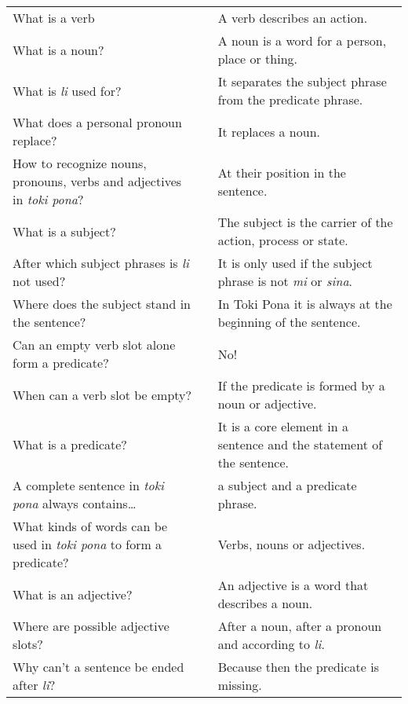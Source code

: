 \begin{supertabular}{p{5,5cm}|ll}
What is a verb && A verb describes an action. \\ %
What is a noun? &&  A noun is a word for a person, place or thing. \\ %
What is \textit{li} used for?  &&  It separates the subject phrase from the predicate phrase.  \\ %
What does a personal pronoun replace? && It replaces a noun. \\ %
How to recognize nouns, pronouns, verbs and adjectives in \textit{toki pona}? && At their position in the sentence. \\ %
What is a subject?  &&   The subject is the carrier of the action, process or state. \\ %
After which subject phrases is \textit{li} not used?  &&   It is only used if the subject phrase is not \textit{mi} or \textit{sina}. \\ %
Where does the subject stand in the sentence?  &&  In Toki Pona it is always at the beginning of the sentence. \\ %
Can an empty verb slot alone form a predicate? && No!  \\ %
When can a verb slot be empty?  &&   If the predicate is formed by a noun or adjective.  \\ %
What is a predicate?  &&   It is a core element in a sentence and the statement of the sentence. \\ %
A complete sentence in \textit{toki pona} always contains\dots  &&  a subject and a predicate phrase.  \\ %
What kinds of words can be used in \textit{toki pona} to form a predicate? && Verbs, nouns or adjectives.  \\ %
What is an adjective?  &&  An adjective is a word that describes a noun.  \\ %
Where are possible adjective slots?  &&  After a noun, after a pronoun and according to \textit{li}. \\  %
Why can't a sentence be ended after \textit{li}? && Because then the predicate is missing. \\ %
\end{supertabular} 

